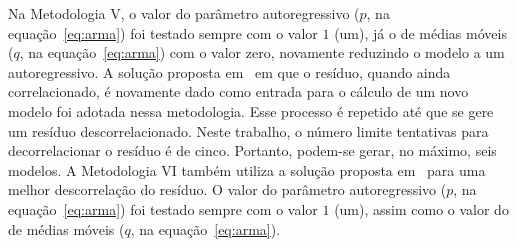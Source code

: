 Na Metodologia V, o valor do parâmetro autoregressivo ($p$, na
equação~\ref{eq:arma}) foi testado sempre com o valor $1$ (um), já o de médias
móveis ($q$, na equação~\ref{eq:arma}) com o valor zero, novamente reduzindo o
modelo a um autoregressivo. A solução proposta em~\citep{Artigo:multiplepasses}
em que o resíduo, quando ainda correlacionado, é novamente dado como entrada
para o cálculo de um novo modelo foi adotada nessa metodologia. Esse processo é
repetido até que se gere um resíduo descorrelacionado. Neste trabalho, o número
limite tentativas para decorrelacionar o resíduo é de cinco. Portanto, podem-se
gerar, no máximo, seis modelos. A Metodologia VI também utiliza a solução proposta
em~\citep{Artigo:multiplepasses} para uma melhor descorrelação do resíduo. O
valor do parâmetro autoregressivo ($p$, na equação~\ref{eq:arma}) foi testado
sempre com o valor $1$ (um), assim como o valor do de médias móveis ($q$, na
equação~\ref{eq:arma}).




